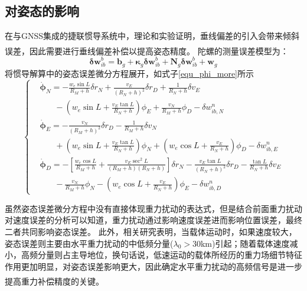 \documentclass[12pt,a4,utf8]{article}
\newcommand{\upcite}[1]{\textsuperscript{\textsuperscript{\cite{#1}}}} %
\begin{document}
\subsection{对姿态的影响}
在与GNSS集成的捷联惯导系统中，理论和实验证明，垂线偏差的引入会带来倾斜误差，因此需要进行垂线偏差补偿以提高姿态精度\upcite{grejner1998gravity,dai2015dynamic}。
陀螺的测量误差模型为：
\begin{equation}
      \bm{\delta w}^b_{ib} = \bm{b}_g + \bm{\kappa}_g \bm{\delta w}^b_{ib} + \bm{\text{N}}_g \bm{\delta w}^b_{ib} + \bm{w}_g
      \label{gyro_bias}
\end{equation}
将惯导解算中的姿态误差微分方程展开，如式子\ref{equ_phi_more}所示
\begin{equation}
            \left\{ \begin{aligned}
            & \dot{\bm{\phi}}_N=-\frac{w_e\sin L}{R_M + h}\delta r_N+\frac{v_E}{(R_N+h)^2}\delta r_D + \frac{1}{R_N + h}\delta v_E \\
            & \ \ \ \ \ \ \ \ - \left ( w_e\sin L + \frac{v_E\tan L}{R_N +h} \right )\phi_E + \frac{v_N}{R_M+h}\phi_D - \delta w^n_{ib,N} \\ 
            & \dot{\bm{\phi}}_E= - \frac{v_N}{(R_M + h)^2}\delta r_D - \frac{1}{R_M + h }\delta v_N \\
            & \ \ \ \ \ \ \ \ + \left ( w_e \sin L + \frac{v_E\tan L}{R_N + h} \right )\phi_N + \left ( w_e \cos L +\frac{v_E}{R_N + h} \right )\phi_D - \delta w^n_{ib,E}\\ 
            & \dot{\bm{\phi}}_D= - \left [ \frac{w_e\cos L}{R_M + h}+ \frac{v_E\sec ^2L}{(R_M + h)(R_N + h)}\right ]\delta r_N - \frac{v_E \tan L}{(R_N+h)^2}\delta r_D - \frac{\tan L}{R_N + h}\delta v_E \\
            & \ \ \ \ \ \ \ \ - \frac{v_N}{R_M + h}\phi_N - \left ( w_e \cos L + \frac{v_E}{R_N + h } \right )\phi_E - \delta w^n_{ib,D}
      \end{aligned} \right.
      \label{equ_phi_more}
\end{equation}

虽然姿态误差微分方程中没有直接体现重力扰动的表达式，但是结合前面重力扰动对速度误差的分析可以知道，重力扰动通过影响速度误差进而影响位置误差，最终二者共同影响姿态误差。
此外，相关研究表明，当载体运动时，如果速度较大，姿态误差则主要由水平重力扰动的中低频分量($\lambda_0>30$km)引起；随着载体速度减小，高频分量则占主导地位，换句话说，低速运动的载体所经历的重力场细节特征作用更加明显，对姿态误差影响更大，因此确定水平重力扰动的高频信号是进一步提高重力补偿精度的关键\upcite{jekeli1994airborne,1020386196.nh}。
\end{document}
